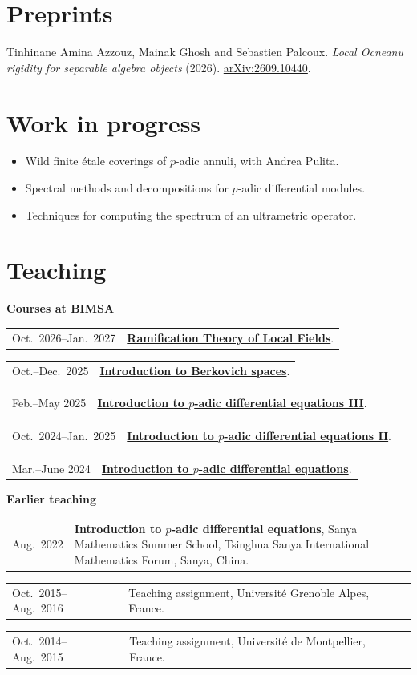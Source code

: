 \documentclass[11pt,a4paper]{article}
\makeatletter
\newcommand{\shortentry}[2]{%
  \begin{tabularx}{\textwidth}{@{}>{\raggedright\arraybackslash}p{32mm}@{\hspace{4mm}}>{\raggedright\arraybackslash}X@{}}\textcolor{muted}{#1} & #2\end{tabularx}\par\vspace{3pt}}
\newcommand{\arxiv}[1]{\href{https://arxiv.org/abs/#1}{arXiv:#1}}
\makeatother
\begin{document}
\section{Preprints}
Tinhinane Amina Azzouz, Mainak Ghosh and Sebastien Palcoux.
\emph{Local Ocneanu rigidity for separable algebra objects} (2026).
\arxiv{2609.10440}.

\section{Work in progress}
\begin{itemize}
\item Wild finite \'etale coverings of $p$-adic annuli, with Andrea Pulita.
\item Spectral methods and decompositions for $p$-adic differential modules.
\item Techniques for computing the spectrum of an ultrametric operator.
\end{itemize}

\section{Teaching}
\textbf{Courses at BIMSA}\par\vspace{2pt}
\shortentry{Oct.\ 2026--Jan.\ 2027}{\href{https://www.bimsa.cn/research_detail/RamTheofLocFie.html}{\textbf{Ramification Theory of Local Fields}}.}
\shortentry{Oct.--Dec.\ 2025}{\href{https://www.bimsa.cn/research_detail/InttoBerspa.html}{\textbf{Introduction to Berkovich spaces}}.}
\shortentry{Feb.--May 2025}{\href{https://www.bimsa.cn/research_detail/Inttop-adifequIII.html}{\textbf{Introduction to $p$-adic differential equations III}}.}
\shortentry{Oct.\ 2024--Jan.\ 2025}{\href{https://www.bimsa.cn/research_detail/Inttop-adifequII.html}{\textbf{Introduction to $p$-adic differential equations II}}.}
\shortentry{Mar.--June 2024}{\href{https://www.bimsa.cn/research_detail/Inttop-adifequ.html}{\textbf{Introduction to $p$-adic differential equations}}.}
\vspace{5pt}
\textbf{Earlier teaching}\par\vspace{2pt}
\shortentry{Aug.\ 2022}{\textbf{Introduction to $p$-adic differential equations}, Sanya Mathematics Summer School, Tsinghua Sanya International Mathematics Forum, Sanya, China.}
\shortentry{Oct.\ 2015--Aug.\ 2016}{Teaching assignment, Universit\'e Grenoble Alpes, France.}
\shortentry{Oct.\ 2014--Aug.\ 2015}{Teaching assignment, Universit\'e de Montpellier, France.}
\end{document}
